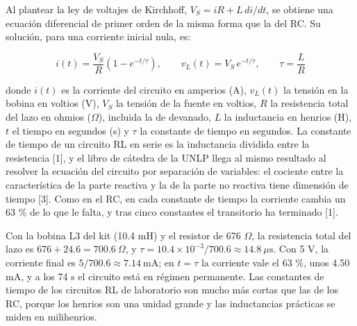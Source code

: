 \documentclass[11pt,letterpaper]{article}
\begin{document}
Al plantear la ley de voltajes de Kirchhoff, $V_S = iR + L\,di/dt$, se obtiene una ecuación diferencial de primer orden de la misma forma que la del RC. Su solución, para una corriente inicial nula, es:

\begin{equation}
  i(t) = \frac{V_S}{R}\left(1 - e^{-t/\tau}\right), \qquad v_L(t) = V_S\,e^{-t/\tau}, \qquad \tau = \frac{L}{R}
\end{equation}

donde $i(t)$ es la corriente del circuito en amperios (A), $v_L(t)$ la tensión en la bobina en voltios (V), $V_S$ la tensión de la fuente en voltios, $R$ la resistencia total del lazo en ohmios (\ensuremath{\Omega}), incluida la de devanado, $L$ la inductancia en henrios (H), $t$ el tiempo en segundos (s) y $\tau$ la constante de tiempo en segundos. La constante de tiempo de un circuito RL en serie es la inductancia dividida entre la resistencia [1], y el libro de cátedra de la UNLP llega al mismo resultado al resolver la ecuación del circuito por separación de variables: el cociente entre la característica de la parte reactiva y la de la parte no reactiva tiene dimensión de tiempo [3]. Como en el RC, en cada constante de tiempo la corriente cambia un 63 \% de lo que le falta, y tras cinco constantes el transitorio ha terminado [1].

Con la bobina L3 del kit (10.4 mH) y el resistor de 676 \ensuremath{\Omega}, la resistencia total del lazo es $676 + 24.6 = 700.6\ \Omega$, y $\tau = 10.4 \times 10^{-3}/700.6 \approx 14.8\ \mu\text{s}$. Con 5 V, la corriente final es $5/700.6 \approx 7.14\ \text{mA}$; en $t = \tau$ la corriente vale el 63 \%, unos 4.50 mA, y a los 74 \textmu{}s el circuito está en régimen permanente. Las constantes de tiempo de los circuitos RL de laboratorio son mucho más cortas que las de los RC, porque los henrios son una unidad grande y las inductancias prácticas se miden en milihenrios.
\end{document}
